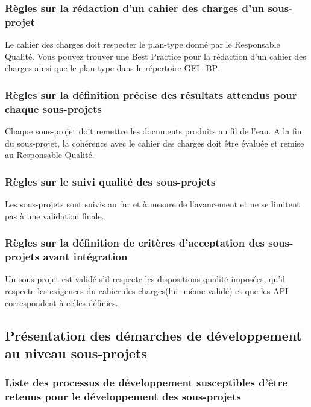         \subsubsection{Règles sur la rédaction d’un cahier des charges d’un 
            sous-projet}

            Le cahier des charges doit respecter le plan-type donné par le
            Responsable Qualité. Vous pouvez trouver une Best Practice pour la
            rédaction d'un cahier des charges ainsi que le plan type dans le 
            répertoire GEI\_BP.

        \subsubsection{Règles sur la définition précise des résultats attendus 
            pour chaque sous-projets}

            Chaque sous-projet doit remettre les documents produits au fil de
            l'eau. A la fin du sous-projet, la cohérence avec le cahier des 
            charges doit être évaluée et remise au Responsable Qualité.            

        \subsubsection{Règles sur le suivi qualité des sous-projets}

            Les sous-projets sont suivis au fur et à mesure de l'avancement et 
            ne se limitent pas à une validation finale.

        \subsubsection{Règles sur la définition de critères d’acceptation des 
            sous-projets avant intégration}

            Un sous-projet est validé s'il respecte les dispositions qualité 
            imposées, qu'il respecte les exigences du cahier des charges(lui-
            même validé) et que les API correspondent à celles définies.

    \subsection{Présentation des démarches de développement au niveau 
            sous-projets}

        \subsubsection{Liste des processus de développement susceptibles d’être 
            retenus pour le développement des sous-projets}

